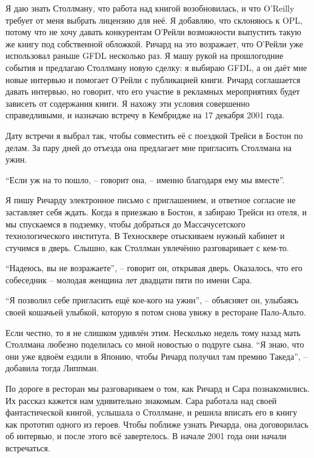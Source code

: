Я даю знать Столлману, что работа над книгой возобновилась, и что O'Reilly требует от меня выбрать лицензию для неё. Я добавляю, что склоняюсь к OPL, потому что не хочу давать конкурентам О'Рейли возможности выпустить такую же книгу под собственной обложкой. Ричард на это возражает, что О'Рейли уже использовал раньше GFDL несколько раз. Я машу рукой на прошлогодние события и предлагаю Столлману новую сделку: я выбираю GFDL, а он даёт мне новые интервью и помогает О'Рейли с публикацией книги. Ричард соглашается давать интервью, но говорит, что его участие в рекламных мероприятиях будет зависеть от содержания книги. Я нахожу эти условия совершенно справедливыми, и назначаю встречу в Кембридже на 17 декабря 2001 года.

Дату встречи я выбрал так, чтобы совместить её с поездкой Трейси в Бостон по делам. За пару дней до отъезда она предлагает мне пригласить Столлмана на ужин.

``Если уж на то пошло, -- говорит она, -- именно благодаря ему мы вместе''.

Я пишу Ричарду электронное письмо с приглашением, и ответное согласие не заставляет себя ждать. Когда я приезжаю в Бостон, я забираю Трейси из отеля, и мы спускаемся в подземку, чтобы добраться до Массачусетского технологического института. В Техносквере отыскиваем нужный кабинет и стучимся в дверь. Слышно, как Столлман увлечённо разговаривает с кем-то.

``Надеюсь, вы не возражаете'', -- говорит он, открывая дверь. Оказалось, что его собеседник -- молодая женщина лет двадцати пяти по имени Сара.

``Я позволил себе пригласить ещё кое-кого на ужин'', -- объясняет он, улыбаясь своей кошачьей улыбкой, которую я потом снова увижу в ресторане Пало-Альто.

Если честно, то я не слишком удивлён этим. Несколько недель тому назад мать Столлмана любезно поделилась со мной новостью о подруге сына. ``Я знаю, что они уже вдвоём ездили в Японию, чтобы Ричард получил там премию Такеда'', -- добавила тогда Липпман. 

По дороге в ресторан мы разговариваем о том, как Ричард и Сара познакомились. Их рассказ кажется нам удивительно знакомым. Сара работала над своей фантастической книгой, услышала о Столлмане, и решила вписать его в книгу как прототип одного из героев. Чтобы поближе узнать Ричарда, она договорилась об интервью, и после этого всё завертелось. В начале 2001 года они начали встречаться.

